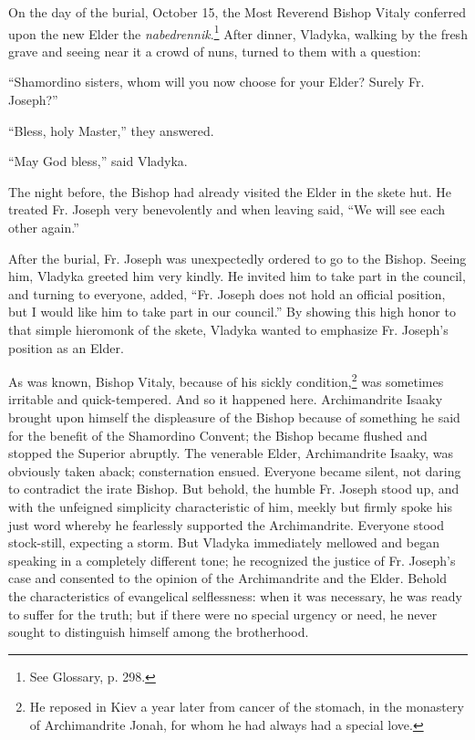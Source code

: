 On the day of the burial, October 15, the Most Reverend Bishop Vitaly conferred upon the new Elder the \textit{nabedrennik}.\footnote{See Glossary, p. 298.} After dinner, Vladyka, walking by the fresh grave and seeing near it a crowd of nuns, turned to them with a question:

“Shamordino sisters, whom will you now choose for your Elder? Surely Fr. Joseph?”

“Bless, holy Master,” they answered.

“May God bless,” said Vladyka.

The night before, the Bishop had already visited the Elder in the skete hut. He treated Fr. Joseph very benevolently and when leaving said, “We will see each other again.”

After the burial, Fr. Joseph was unexpectedly ordered to go to the Bishop. Seeing him, Vladyka greeted him very kindly. He invited him to take part in the council, and turning to everyone, added, “Fr. Joseph does not hold an official position, but I would like him to take part in our council.” By showing this high honor to that simple hieromonk of the skete, Vladyka wanted to emphasize Fr. Joseph's position as an Elder.

As was known, Bishop Vitaly, because of his sickly condition,\footnote{He reposed in Kiev a year later from cancer of the stomach, in the monastery of Archimandrite Jonah, for whom he had always had a special love.} was sometimes irritable and quick-tempered. And so it happened here. Archimandrite Isaaky brought upon himself the displeasure of the Bishop because of something he said for the benefit of the Shamordino Convent; the Bishop became flushed and stopped the Superior abruptly. The venerable Elder, Archimandrite Isaaky, was obviously taken aback; consternation ensued. Everyone became silent, not daring to contradict the irate Bishop. But behold, the humble Fr. Joseph stood up, and with the unfeigned simplicity characteristic of him, meekly but firmly spoke his just word whereby he fearlessly supported the Archimandrite. Everyone stood stock-still, expecting a storm. But Vladyka immediately mellowed and began speaking in a completely different tone; he recognized the justice of Fr. Joseph's case and consented to the opinion of the Archimandrite and the Elder. Behold the characteristics of evangelical selflessness: when it was necessary, he was ready to suffer for the truth; but if there were no special urgency or need, he never sought to distinguish himself among the brotherhood.

